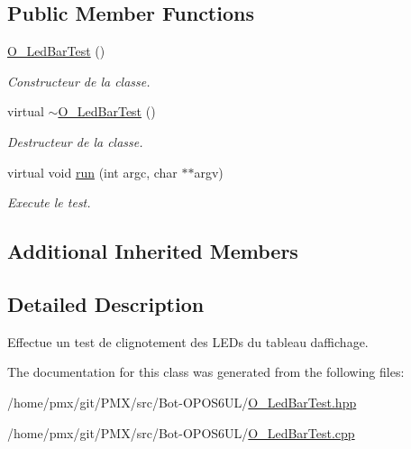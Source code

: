 \subsection*{Public Member Functions}
\begin{DoxyCompactItemize}
\item 
\mbox{\label{classO__LedBarTest_ac34669e824ed2e437980865cbeade34b}} 
\hyperlink{classO__LedBarTest_ac34669e824ed2e437980865cbeade34b}{O\+\_\+\+Led\+Bar\+Test} ()
\begin{DoxyCompactList}\small\item\em Constructeur de la classe. \end{DoxyCompactList}\item 
\mbox{\label{classO__LedBarTest_aec8dc54081f7e1a5c0ef86a2bf07d2d3}} 
virtual \hyperlink{classO__LedBarTest_aec8dc54081f7e1a5c0ef86a2bf07d2d3}{$\sim$\+O\+\_\+\+Led\+Bar\+Test} ()
\begin{DoxyCompactList}\small\item\em Destructeur de la classe. \end{DoxyCompactList}\item 
\mbox{\label{classO__LedBarTest_af9e0e172d13b334cda0fe32bb659b414}} 
virtual void \hyperlink{classO__LedBarTest_af9e0e172d13b334cda0fe32bb659b414}{run} (int argc, char $\ast$$\ast$argv)
\begin{DoxyCompactList}\small\item\em Execute le test. \end{DoxyCompactList}\end{DoxyCompactItemize}
\subsection*{Additional Inherited Members}


\subsection{Detailed Description}
Effectue un test de clignotement des L\+E\+Ds du tableau d\textquotesingle{}affichage. 

The documentation for this class was generated from the following files\+:\begin{DoxyCompactItemize}
\item 
/home/pmx/git/\+P\+M\+X/src/\+Bot-\/\+O\+P\+O\+S6\+U\+L/\hyperlink{O__LedBarTest_8hpp}{O\+\_\+\+Led\+Bar\+Test.\+hpp}\item 
/home/pmx/git/\+P\+M\+X/src/\+Bot-\/\+O\+P\+O\+S6\+U\+L/\hyperlink{O__LedBarTest_8cpp}{O\+\_\+\+Led\+Bar\+Test.\+cpp}\end{DoxyCompactItemize}
